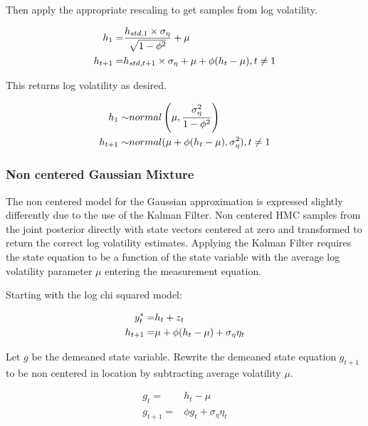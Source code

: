 \documentclass[12pt, a4paper]{article}
\begin{document}
        Then apply the appropriate rescaling to get samples from log volatility. 
        
        $$
        \begin{aligned}
        h_1 =& \space \frac{h_{std, 1}\times \sigma_{\eta}} {\sqrt{1 - \phi^2}} + \mu \\
        h_{t+1} =& \space h_{std, t+1}\times \sigma_{\eta} + \mu  + \phi(h_{t} - \mu),\space t\neq 1
        \end{aligned}
        $$
        
        This returns log volatility as desired.
        
        $$
        \begin{aligned}
        h_1 \sim& \space normal \left(\mu, \frac{\sigma_{\eta}^2}{1-\phi^2}\right) \\
        h_{t+1} \sim& \space normal(\mu +\phi(h_t - \mu) , \sigma_{\eta}^2), \space\space t\neq 1\\ 
        \end{aligned}
        $$

        \subsubsection{Non centered Gaussian Mixture}
        The non centered model for the Gaussian approximation is expressed slightly differently due to the use of the Kalman Filter. Non centered HMC samples from the joint posterior directly with state vectors centered at zero and transformed to return the correct log volatility estimates. Applying the Kalman Filter requires the state equation to be a function of the state variable with the average log volatility parameter $\mu$ entering the measurement equation.
        
        Starting with the log chi squared model:

        $$
        \begin{aligned}
        y^{\ast}_t =& h_t + z_t \\
        h_{t+1} =& \space \mu +\phi(h_t - \mu) + \sigma_{\eta} \eta_t
        \end{aligned}
        $$
        

        Let $g$ be the demeaned state variable. Rewrite the demeaned state equation $g_{t+1}$ to be non centered in location by subtracting average volatility $\mu$.

        $$
        \begin{aligned}
        g_t =& h_t - \mu \\
        g_{t+1} =& \phi g_t + \sigma_{\eta}\eta_{t}
        \end{aligned}
        $$
\end{document}
